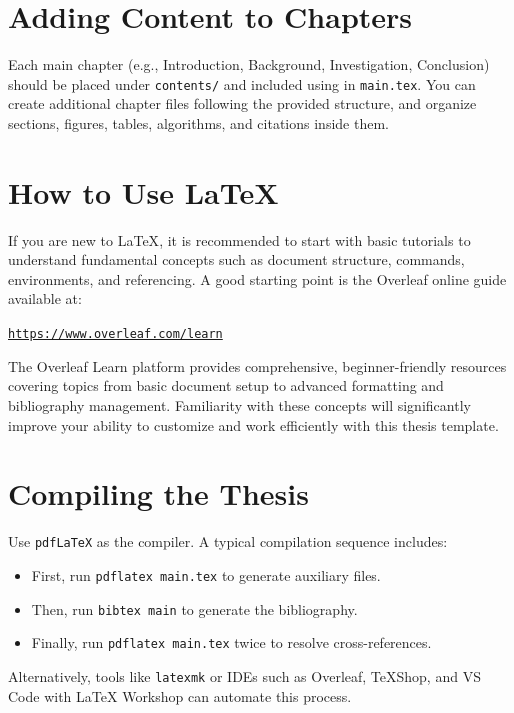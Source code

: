 \section{Adding Content to Chapters}
\begin{paragraph}
Each main chapter (e.g., Introduction, Background, Investigation, Conclusion) should be placed under \texttt{contents/} and included using \verb|| in \texttt{main.tex}. You can create additional chapter files following the provided structure, and organize sections, figures, tables, algorithms, and citations inside them.
\end{paragraph}

\section{How to Use {\LaTeX}}
\begin{paragraph}
If you are new to {\LaTeX}, it is recommended to start with basic tutorials to understand fundamental concepts such as document structure, commands, environments, and referencing. A good starting point is the Overleaf online guide available at:

\begin{center}
\href{https://www.overleaf.com/learn}{\texttt{https://www.overleaf.com/learn}}
\end{center}

The Overleaf Learn platform provides comprehensive, beginner-friendly resources covering topics from basic document setup to advanced formatting and bibliography management. Familiarity with these concepts will significantly improve your ability to customize and work efficiently with this thesis template.
\end{paragraph}

\section{Compiling the Thesis}
\begin{paragraph}
Use \texttt{pdfLaTeX} as the compiler. A typical compilation sequence includes:
\begin{itemize}[leftmargin=\paritemindent]
    \item First, run \texttt{pdflatex main.tex} to generate auxiliary files.
    \item Then, run \texttt{bibtex main} to generate the bibliography.
    \item Finally, run \texttt{pdflatex main.tex} twice to resolve cross-references.
\end{itemize}

Alternatively, tools like \texttt{latexmk} or IDEs such as Overleaf, TeXShop, and VS Code with {\LaTeX} Workshop can automate this process.
\end{paragraph}

